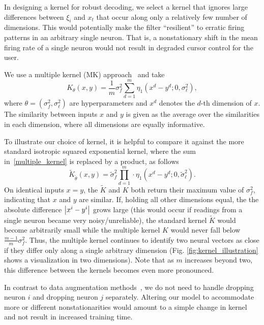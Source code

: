 In designing a kernel for robust decoding, we select a kernel that ignores large differences between $\xi_i$ and $x_t$ that occur along only a relatively few number of dimensions. This would potentially make the filter ``resilient'' to erratic firing patterns in an arbitrary single neuron. That is, a nonstationary shift in the mean firing rate of a single neuron would not result in degraded cursor control for the user. 

We use a multiple kernel (MK) approach~\cite{Gon11} and take
\begin{equation}
\label{multiple_kernel}
K_\theta(x,y) = \frac{1}{m} \sigma_f^2 \sum_{d=1}^m \eta_1(x^d - y^d; 0, \sigma_\ell^2),
\end{equation}
where $\theta = (\sigma_f^2,\sigma_\ell^2)$ are hyperparameters and  $x^d$ denotes the $d$-th dimension of $x$.  The similarity between inputs $x$ and $y$ is given as the average over the similarities in each dimension, where all dimensions are equally informative.

To illustrate our choice of kernel, it is helpful to compare it against the more standard isotropic squared exponential kernel, where the sum in~\eqref{multiple_kernel} is replaced by a product, as follows
\begin{equation}
\label{iso_se_kernel}
\tilde K_{\tilde\theta}(x,y) = \tilde \sigma_f^2 \prod_{d=1}^m \cdot \eta_1(x^d - y^d; 0, \tilde \sigma_\ell^2).
\end{equation}
On identical inputs $x=y$, the $\tilde K$ and $K$ both return their maximum value of $\sigma_f^2$, indicating that $x$ and $y$ are similar.  If, holding all other dimensions equal, the the absolute difference $\left\lvert x^i-y^i\right\rvert$ grows large (this would occur if readings from a single neuron became very noisy/unreliable), the standard kernel $\tilde K$ would become arbitrarily small while the multiple kernel $K$ would never fall below $\tfrac{m-1}{m} \sigma_f^2$.  Thus, the multiple kernel continues to identify two neural vectors as close if they differ only along a single arbitrary dimension (Fig. \ref{fig:kernel_illustration} shows a visualization in two dimensions).  Note that as $m$ increases beyond two, this difference between the kernels becomes even more pronounced.  

In contrast to data augmentation methods~\cite{An96, Sussillo2016a}, we do not need to handle dropping neuron $i$ and dropping neuron $j$ separately.  Altering our model to accommodate more or different nonstationarities would amount to a simple change in kernel and not result in increased training time.

